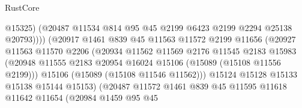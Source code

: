 \begin{lexlean}{RustCore}
\begin{coremodule}
                                        @15325)
                                      (@20487
                                        @11534
                                        @814
                                        @95
                                        @45
                                        @2199
                                        @6423
                                        @2199
                                        @2294
                                        @25138
                                        @20793))))
                                (@20917
                                  @1461
                                  @839
                                  @45
                                  @11563
                                  @11572
                                  @2199
                                  @11656
                                  (@20927
                                    @11563
                                    @11570
                                    @2206
                                    (@20934
                                      @11562
                                      @11569
                                      @2176
                                      @11545
                                      @2183
                                      @15983
                                      (@20948
                                        @11555
                                        @2183
                                        @20954
                                        @16024
                                        @15106
                                        (@15089 (@15108 @11556 @2199)))
                                      @15106
                                      (@15089 (@15108 @11546 @11562)))
                                    @15124
                                    @15128
                                    @15133
                                    @15138
                                    @15144
                                    @15153)
                                  (@20487
                                    @11572
                                    @1461
                                    @839
                                    @45
                                    @11595
                                    @11618
                                    @11642
                                    @11654
                                    (@20984
                                      @1459
                                      @95
                                      @45

\end{coremodule}
\end{lexlean}
